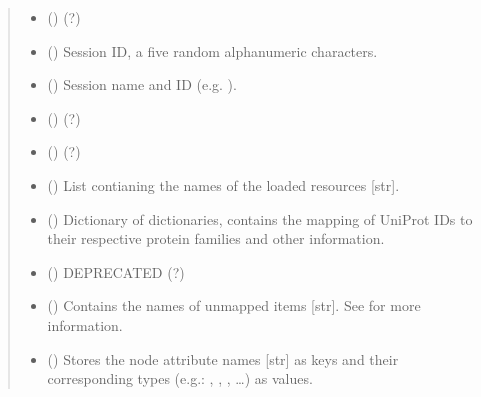 \documentclass[letterpaper,10pt,english]{sphinxmanual}
\begin{document}
\begin{fulllineitems}
\begin{quote}
\begin{description}
\begin{itemize}
\item {} 
 () \textendash{} (?)

\item {} 
 () \textendash{} Session ID, a five random alphanumeric characters.

\item {} 
 () \textendash{} Session name and ID (e.g. ).

\item {} 
 () \textendash{} (?)

\item {} 
 () \textendash{} (?)

\item {} 
 () \textendash{} List contianing the names of the loaded resources {[}str{]}.

\item {} 
 () \textendash{} Dictionary of dictionaries, contains the mapping of UniProt IDs
to their respective protein families and other information.

\item {} 
 () \textendash{} DEPRECATED (?)

\item {} 
 () \textendash{} Contains the names of unmapped items {[}str{]}. See
{\hyperref[\detokenize{main:pypath.main.PyPath.map_item}]{}} for more information.

\item {} 
 () \textendash{} Stores the node attribute names {[}str{]} as keys and their
corresponding types (e.g.: , , , …) as
values.


\end{itemize}
\end{description}
\end{quote}
\end{fulllineitems}
\end{document}
